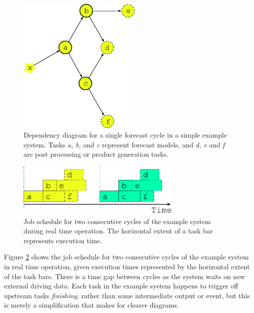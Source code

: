 \documentclass[11pt,a4paper]{article}
\begin{document}
\begin{figure} 
    \begin{center}
        \includegraphics[width=6cm]{inkscape-svg/dep-one-cycle} 
    \end{center}
    \caption{\small Dependency diagram for a single forecast cycle in a
    simple example system. Tasks {\em a, b,} and {\em c} represent
    forecast models, and {\em d, e} and {\em f} are post processing or
    product generation tasks.} 
    \label{fig-dep-one} 
\end{figure} 

\begin{figure}
    \begin{center}
        \includegraphics[width=8cm]{inkscape-svg/timeline-one}
    \end{center}
    \caption{\small Job schedule for two consecutive cycles of
the example system during real time operation. The horizontal extent of
a task bar represents execution time.}
    \label{fig-time-one}
\end{figure}

Figure \ref{fig-time-one} shows the job schedule for two consecutive
cycles of the example system in real time operation, given execution
times represented by the horizontal extent of the task bars. There is a
time gap between cycles as the system waits on new external driving
data.  Each task in the example system happens to trigger off upstream
tasks {\em finishing}, rather than some intermediate output or event,
but this is merely a simplification that makes for clearer diagrams.
\end{document}
